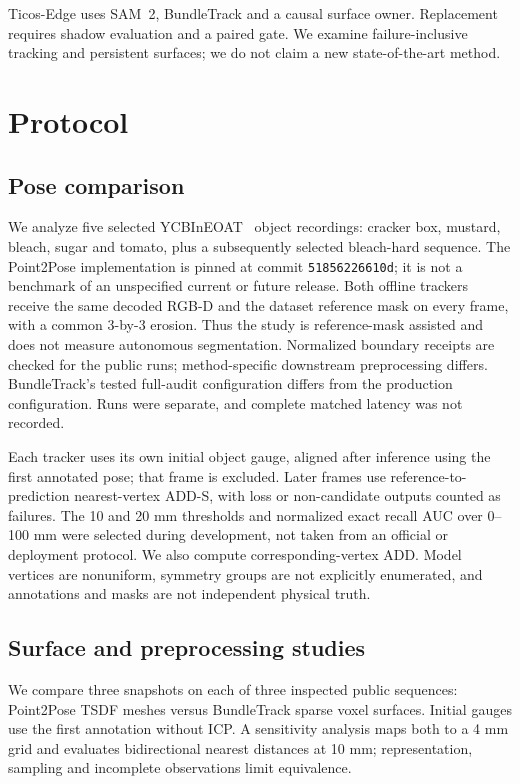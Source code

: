 \documentclass[10pt,journal]{IEEEtran}
\begin{document}
Ticos-Edge uses SAM~2, BundleTrack and a causal surface owner. Replacement requires shadow evaluation and a paired gate. We examine failure-inclusive tracking and persistent surfaces; we do not claim a new state-of-the-art method.

\section{Protocol}
\subsection{Pose comparison}
We analyze five selected YCBInEOAT~\cite{tracknet} object recordings: cracker box, mustard, bleach, sugar and tomato, plus a subsequently selected bleach-hard sequence. The Point2Pose implementation is pinned at commit \texttt{51856226610d}; it is not a benchmark of an unspecified current or future release. Both offline trackers receive the same decoded RGB-D and the dataset reference mask on every frame, with a common 3-by-3 erosion. Thus the study is reference-mask assisted and does not measure autonomous segmentation. Normalized boundary receipts are checked for the public runs; method-specific downstream preprocessing differs. BundleTrack's tested full-audit configuration differs from the production configuration. Runs were separate, and complete matched latency was not recorded.

Each tracker uses its own initial object gauge, aligned after inference using the first annotated pose; that frame is excluded. Later frames use reference-to-prediction nearest-vertex ADD-S, with loss or non-candidate outputs counted as failures. The 10 and 20 mm thresholds and normalized exact recall AUC over 0--100 mm were selected during development, not taken from an official or deployment protocol. We also compute corresponding-vertex ADD. Model vertices are nonuniform, symmetry groups are not explicitly enumerated, and annotations and masks are not independent physical truth.

\subsection{Surface and preprocessing studies}
We compare three snapshots on each of three inspected public sequences: Point2Pose TSDF meshes versus BundleTrack sparse voxel surfaces. Initial gauges use the first annotation without ICP. A sensitivity analysis maps both to a 4 mm grid and evaluates bidirectional nearest distances at 10 mm; representation, sampling and incomplete observations limit equivalence.
\end{document}
